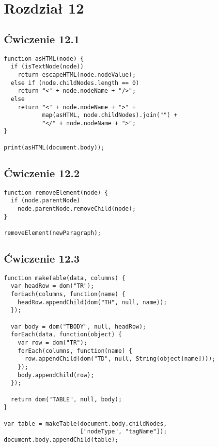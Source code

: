 \section*{Rozdział 12}
\label{sol:12}

\subsection*{Ćwiczenie 12.1}
\label{sol:12.1}
     
\begin{verbatim} 
function asHTML(node) {
  if (isTextNode(node))
    return escapeHTML(node.nodeValue);
  else if (node.childNodes.length == 0)
    return "<" + node.nodeName + "/>";
  else
    return "<" + node.nodeName + ">" +
           map(asHTML, node.childNodes).join("") +
           "</" + node.nodeName + ">";
}

print(asHTML(document.body));
\end{verbatim}

  
\subsection*{Ćwiczenie 12.2}
\label{sol:12.2}
    
\begin{verbatim} 
function removeElement(node) {
  if (node.parentNode)
    node.parentNode.removeChild(node);
}

removeElement(newParagraph);
\end{verbatim}
  
  
\subsection*{Ćwiczenie 12.3}
\label{sol:12.3}
    
\begin{verbatim} 
function makeTable(data, columns) {
  var headRow = dom("TR");
  forEach(columns, function(name) {
    headRow.appendChild(dom("TH", null, name));
  });

  var body = dom("TBODY", null, headRow);
  forEach(data, function(object) {
    var row = dom("TR");
    forEach(columns, function(name) {
      row.appendChild(dom("TD", null, String(object[name])));
    });
    body.appendChild(row);
  });

  return dom("TABLE", null, body);
}

var table = makeTable(document.body.childNodes,
                      ["nodeType", "tagName"]);
document.body.appendChild(table);
\end{verbatim}
    
